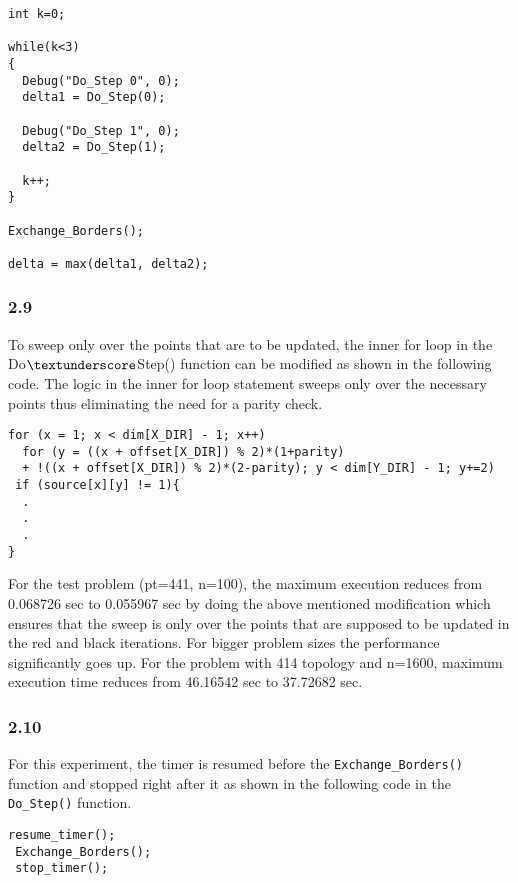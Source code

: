 \begin{lstlisting}[style=CStyle]
int k=0;

while(k<3)
{
  Debug("Do_Step 0", 0);
  delta1 = Do_Step(0);
  
  Debug("Do_Step 1", 0);
  delta2 = Do_Step(1);
  
  k++;
}   

Exchange_Borders();

delta = max(delta1, delta2);
\end{lstlisting}

\subsubsection*{2.9}
	To sweep only over the points that are to be updated, the inner for loop in the Do$ \textunderscore $Step() function can be modified as shown in the following code. The logic in the inner for loop statement sweeps only over the necessary points thus eliminating the need for a parity check. \\
	
\begin{lstlisting}[style=CStyle]
 for (x = 1; x < dim[X_DIR] - 1; x++)
  for (y = ((x + offset[X_DIR]) % 2)*(1+parity) 
  + !((x + offset[X_DIR]) % 2)*(2-parity); y < dim[Y_DIR] - 1; y+=2)
 if (source[x][y] != 1){
  .
  .
  .
}
\end{lstlisting}
        
For the test problem (pt=441, n=100), the maximum execution reduces from 0.068726 sec to 0.055967 sec by doing the above mentioned modification which ensures that the sweep is only over the points that are supposed to be updated in the red and black iterations. For bigger problem sizes the performance significantly goes up. For the problem with 414 topology and n=1600, maximum execution time reduces from 46.16542 sec to 37.72682 sec.

\subsubsection*{2.10}
For this experiment, the timer is resumed before the \texttt{Exchange\_Borders()} function and stopped right after it as shown in the following code in the \texttt{Do\_Step()} function. 

\begin{lstlisting}[style=CStyle]
 resume_timer();
 Exchange_Borders();
 stop_timer();
\end{lstlisting}
	
